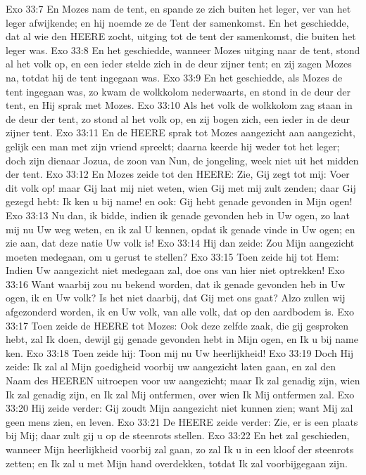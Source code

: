 Exo 33:7  En Mozes nam de tent, en spande ze zich buiten het leger, ver van het leger afwijkende; en hij noemde ze de Tent der samenkomst. En het geschiedde, dat al wie den HEERE zocht, uitging tot de tent der samenkomst, die buiten het leger was.
Exo 33:8  En het geschiedde, wanneer Mozes uitging naar de tent, stond al het volk op, en een ieder stelde zich in de deur zijner tent; en zij zagen Mozes na, totdat hij de tent ingegaan was.
Exo 33:9  En het geschiedde, als Mozes de tent ingegaan was, zo kwam de wolkkolom nederwaarts, en stond in de deur der tent, en Hij sprak met Mozes.
Exo 33:10  Als het volk de wolkkolom zag staan in de deur der tent, zo stond al het volk op, en zij bogen zich, een ieder in de deur zijner tent.
Exo 33:11  En de HEERE sprak tot Mozes aangezicht aan aangezicht, gelijk een man met zijn vriend spreekt; daarna keerde hij weder tot het leger; doch zijn dienaar Jozua, de zoon van Nun, de jongeling, week niet uit het midden der tent.
Exo 33:12  En Mozes zeide tot den HEERE: Zie, Gij zegt tot mij: Voer dit volk op! maar Gij laat mij niet weten, wien Gij met mij zult zenden; daar Gij gezegd hebt: Ik ken u bij name! en ook: Gij hebt genade gevonden in Mijn ogen!
Exo 33:13  Nu dan, ik bidde, indien ik genade gevonden heb in Uw ogen, zo laat mij nu Uw weg weten, en ik zal U kennen, opdat ik genade vinde in Uw ogen; en zie aan, dat deze natie Uw volk is!
Exo 33:14  Hij dan zeide: Zou Mijn aangezicht moeten medegaan, om u gerust te stellen?
Exo 33:15  Toen zeide hij tot Hem: Indien Uw aangezicht niet medegaan zal, doe ons van hier niet optrekken!
Exo 33:16  Want waarbij zou nu bekend worden, dat ik genade gevonden heb in Uw ogen, ik en Uw volk? Is het niet daarbij, dat Gij met ons gaat? Alzo zullen wij afgezonderd worden, ik en Uw volk, van alle volk, dat op den aardbodem is.
Exo 33:17  Toen zeide de HEERE tot Mozes: Ook deze zelfde zaak, die gij gesproken hebt, zal Ik doen, dewijl gij genade gevonden hebt in Mijn ogen, en Ik u bij name ken.
Exo 33:18  Toen zeide hij: Toon mij nu Uw heerlijkheid!
Exo 33:19  Doch Hij zeide: Ik zal al Mijn goedigheid voorbij uw aangezicht laten gaan, en zal den Naam des HEEREN uitroepen voor uw aangezicht; maar Ik zal genadig zijn, wien Ik zal genadig zijn, en Ik zal Mij ontfermen, over wien Ik Mij ontfermen zal.
Exo 33:20  Hij zeide verder: Gij zoudt Mijn aangezicht niet kunnen zien; want Mij zal geen mens zien, en leven.
Exo 33:21  De HEERE zeide verder: Zie, er is een plaats bij Mij; daar zult gij u op de steenrots stellen.
Exo 33:22  En het zal geschieden, wanneer Mijn heerlijkheid voorbij zal gaan, zo zal Ik u in een kloof der steenrots zetten; en Ik zal u met Mijn hand overdekken, totdat Ik zal voorbijgegaan zijn.
